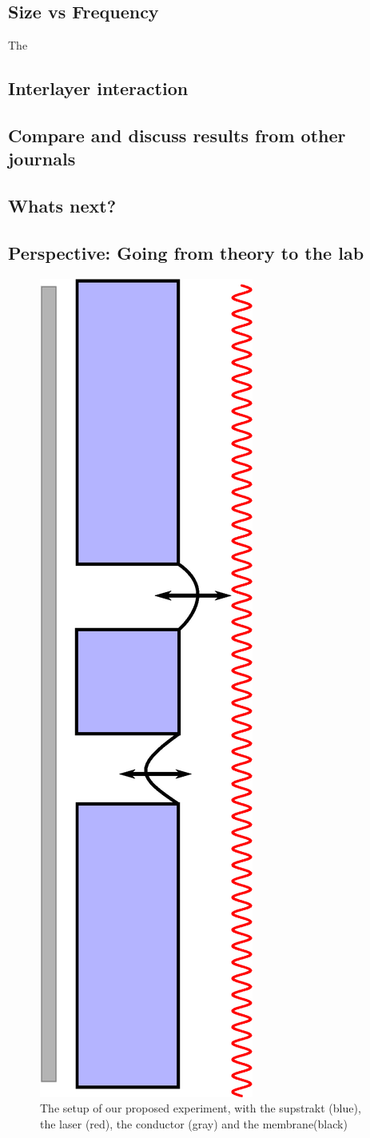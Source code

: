 \subsection{Size vs Frequency}
The 
\subsection{Interlayer interaction}

\subsection{Compare and discuss results from other journals}

\subsection{Whats next?}

\subsection{Perspective: Going from theory to the lab}

\begin{figure}
  \centering
  \includegraphics[width=0.3\columnwidth]{Figures/Fuck_dig_christoffer.eps}
  \caption{The setup of our proposed experiment, with the supstrakt (blue), the laser (red), the conductor (gray) and the membrane(black)}
  \label{FDC}
\end{figure}